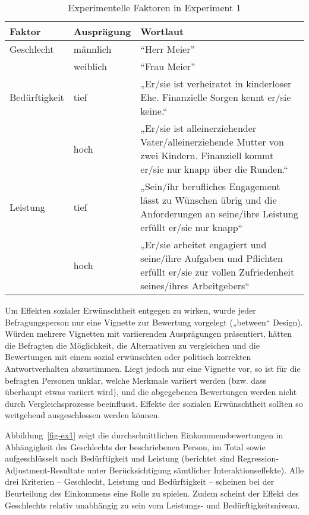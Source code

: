 \documentclass[a4paper,12pt]{article}
\begin{document}
\begin{table}
    \small
    \caption{Experimentelle Faktoren in Experiment 1}\label{tab-ex1-faktoren}
    \begin{tabularx}{\textwidth}{@{}llX@{}}
        \toprule
        Faktor          & Ausprägung & Wortlaut       \\\midrule
        Geschlecht      & männlich     & “Herr Meier”   \\
                        & weiblich     & “Frau Meier”   \\
        \addlinespace
        Bedürftigkeit   & tief         & „Er/sie ist verheiratet in kinderloser Ehe. Finanzielle Sorgen kennt er/sie keine.“ \\
                        & hoch         & „Er/sie ist alleinerziehender Vater/alleinerziehende Mutter von zwei Kindern. Finanziell kommt er/sie nur knapp über die Runden.“ \\
        \addlinespace
        Leistung        & tief         & „Sein/ihr berufliches Engagement lässt zu Wünschen übrig und die Anforderungen an seine/ihre Leistung erfüllt er/sie nur knapp“   \\
                        & hoch         & „Er/sie arbeitet engagiert und seine/ihre Aufgaben und Pflichten erfüllt er/sie zur vollen Zufriedenheit seines/ihres Arbeitgebers“  \\
        \bottomrule
    \end{tabularx}
\end{table}


Um Effekten sozialer Erwünschtheit entgegen zu wirken, wurde jeder
Befragungsperson nur eine Vignette zur Bewertung vorgelegt („between“ Design).
Würden mehrere Vignetten mit variierenden Ausprägungen präsentiert, hätten die
Befragten die Möglichkeit, die Alternativen zu vergleichen und die Bewertungen
mit einem sozial erwünschten oder politisch korrekten Antwortverhalten
abzustimmen. Liegt jedoch nur eine Vignette vor, so ist für die befragten
Personen unklar, welche Merkmale variiert werden (bzw. dass überhaupt etwas
variiert wird), und die abgegebenen Bewertungen werden nicht durch
Vergleichsprozesse beeinflusst. Effekte der sozialen Erwünschtheit sollten so
weitgehend ausgeschlossen werden können.

Abbildung~\ref{fig-ex1} zeigt die durchschnittlichen Einkommensbewertungen in
Abhängigkeit des Geschlechts der beschriebenen Person, im Total sowie
aufgeschlüsselt nach Bedürftigkeit und Leistung (berichtet sind Regression-Adjustment-Resultate unter 
Berücksichtigung sämtlicher Interaktionseffekte). Alle drei Kriterien --
Geschlecht, Leistung und Bedürftigkeit -- scheinen bei der Beurteilung des
Einkommens eine Rolle zu spielen. Zudem scheint der Effekt des Geschlechts
relativ unabhängig zu sein vom Leistungs- und Bedürftigkeitsniveau.
\end{document}
